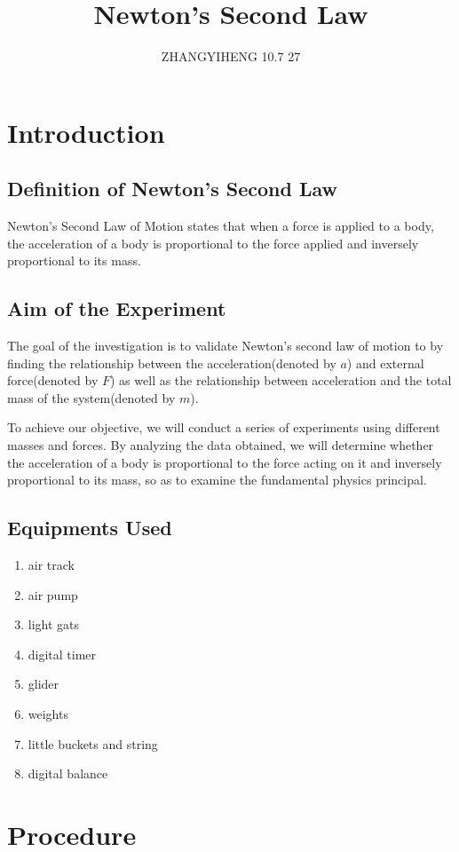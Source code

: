 \documentclass[12pt,a4paper]{article}
\title{Newton's Second Law}
\author{ZHANGYIHENG 10.7 27}
\date{}
\begin{document}
\maketitle
\tableofcontents
\newpage
\section{Introduction}
\subsection{Definition of Newton's Second Law}
Newton's Second Law of Motion states that when a force is applied to a body, the acceleration of a body is proportional to the force applied and inversely proportional to its mass.
\subsection{Aim of the Experiment}
The goal of the investigation is to validate Newton's second law of motion to by finding the relationship between the acceleration(denoted by $a$) and external force(denoted by $F$) as well as the relationship between acceleration and the total mass of the system(denoted by $m$).\par
To achieve our objective, we will conduct a series of experiments using different masses and forces. By analyzing the data obtained, we will determine whether the acceleration of a body is proportional to the force acting on it and inversely proportional to its mass, so as to examine the fundamental physics principal. \par
\subsection{Equipments Used}
\begin{enumerate}
    \setlength{\itemsep}{0em}
    \setlength{\parsep}{0em}
    \item air track
    \item air pump
    \item light gats
    \item digital timer
    \item glider
    \item weights
    \item little buckets and string
    \item digital balance
    \setlength{\topsep}{0em}
\end{enumerate}

\section{Procedure}
\end{document}
